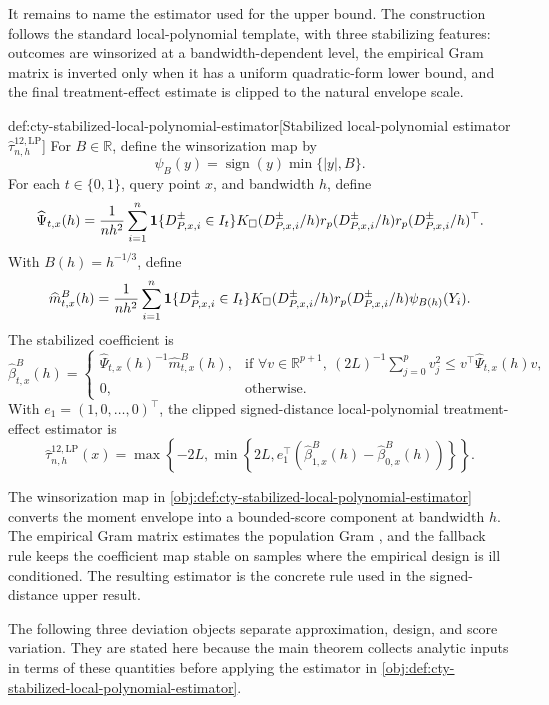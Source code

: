 \documentclass[11pt]{article}
\begin{document}
It remains to name the estimator used for the upper bound. The construction follows the standard local-polynomial template, with three stabilizing features: outcomes are winsorized at a bandwidth-dependent level, the empirical Gram matrix is inverted only when it has a uniform quadratic-form lower bound, and the final treatment-effect estimate is clipped to the natural envelope scale.

\begin{definitionv}{def:cty-stabilized-local-polynomial-estimator}[Stabilized local-polynomial estimator \(\widehat\tau^{12,\mathrm{LP}}_{n,h}\)]
For \(B\in\mathbb R\), define the winsorization map by
\[
\psi_B(y)=\operatorname{sign}(y)\min\{|y|,B\}.
\]
For each \(t\in\{0,1\}\), query point \(x\), and bandwidth \(h\), define
\[
\widehat\Psi_{t,x}(h)
 =
 {1\over nh^2}\sum_{i=1}^n
 \mathbf 1\{D^{\pm}_{P,x,i}\in I_t\}K_\square(D^{\pm}_{P,x,i}/h)
 r_p(D^{\pm}_{P,x,i}/h)r_p(D^{\pm}_{P,x,i}/h)^\top .
\]
With \(B(h)=h^{-1/3}\), define
\[
\widehat m^B_{t,x}(h)
 =
 {1\over nh^2}\sum_{i=1}^n
 \mathbf 1\{D^{\pm}_{P,x,i}\in I_t\}K_\square(D^{\pm}_{P,x,i}/h)
 r_p(D^{\pm}_{P,x,i}/h)\psi_{B(h)}(Y_i).
\]
The stabilized coefficient is
\[
\widehat\beta^B_{t,x}(h)
 =
 \begin{cases}
 \widehat\Psi_{t,x}(h)^{-1}\widehat m^B_{t,x}(h),
 & \text{if }\forall v\in\mathbb R^{p+1},\ (2L)^{-1}\sum_{j=0}^p v_j^2\leq v^\top\widehat\Psi_{t,x}(h)v,\\
 0,
 & \text{otherwise.}
 \end{cases}
\]
With \(e_1=(1,0,\ldots,0)^\top\), the clipped signed-distance local-polynomial treatment-effect estimator is
\[
\widehat\tau^{12,\mathrm{LP}}_{n,h}(x)
 =
 \max\!\left\{-2L,\min\!\left\{2L,
 e_1^\top(\widehat\beta^B_{1,x}(h)-\widehat\beta^B_{0,x}(h))
 \right\}\right\}.
\]
\end{definitionv}

The winsorization map  in \cref{obj:def:cty-stabilized-local-polynomial-estimator} converts the moment envelope into a bounded-score component at bandwidth \(h\). The empirical Gram matrix estimates the population Gram , and the fallback rule keeps the coefficient map stable on samples where the empirical design is ill conditioned. The resulting estimator  is the concrete rule used in the signed-distance upper result.

The following three deviation objects separate approximation, design, and score variation. They are stated here because the main theorem collects analytic inputs in terms of these quantities before applying the estimator in \cref{obj:def:cty-stabilized-local-polynomial-estimator}.
\end{document}
